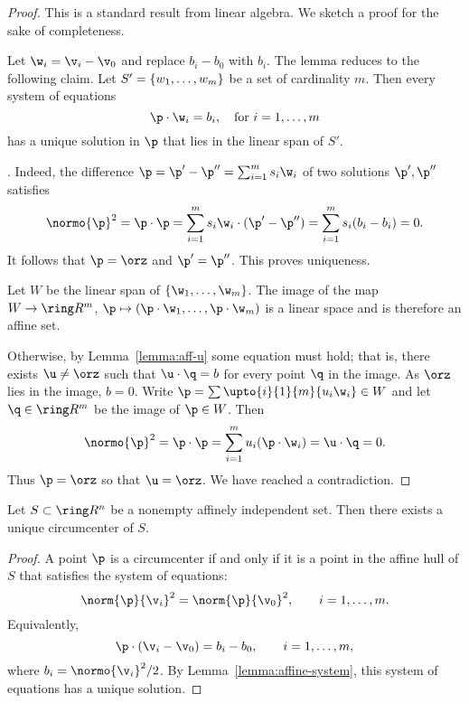 \begin{cnl}
\begin{proof} This is a standard result from linear algebra.
We sketch a proof for the sake of completeness.  

Let $\w_i = \v_i-\v_0$ and replace $b_i-b_0$ with $b_i$.  
The lemma reduces to the following claim.
Let $S' = \{{w}_{1},\ldots,{w}_{m}\}$ be a  set
of cardinality $m$.  Then every system of equations
\[  
\p \cdot \w_i = b_i,\quad \text{for } \fordots{i}{1}{m}
\] 
has a unique solution in $\p$ that lies in the linear span of $S'$.

. Indeed, the difference 
$\p = \p'-\p'' = \sumupto{i}{1}{m}{ s_i \w_i}$ of two solutions
$\p',\p''$ satisfies
\[  
\normo{\p}^2=\p\cdot\p = \sumupto{i}{1}{m}{ s_i \w_i} \cdot (\p' - \p'') =
\sumupto{i}{1}{m}{ s_i (b_i-b_i)}= 0.
\] 
It follows that $\p=\orz$ and $\p'=\p''$.  This proves uniqueness.

Let $W$ be the linear span of $\setenumdots{\w}{1}{m}$.  The image of the
map $W\to\vecR{m}$, $\p\mapsto (\p\cdot\w_1,\ldots,\p\cdot\w_m)$ is
a linear space and is therefore an affine set.

Otherwise, by Lemma~\ref{lemma:aff-u} some equation must hold; that
is, there exists $\u\ne \orz$ such that $\u\cdot \q =b$ for every
point $\q$ in the image.  As $\orz$ lies in the image, $b=0$.  Write
$\p = \sum\upto{i}{1}{m}{ u_i \w_i}\in W$ and let $\q\in\vecR{m}$ be the image of
$\p\in W$.  Then
\[  
\normo{\p}^2 = \p\cdot\p = \sumupto{i}{1}{m}{ u_i (\p \cdot \w_i)} = \u\cdot \q = 0.
\]  
Thus $\p=\orz$ so that $\u=\orz$.  We have reached a contradiction.
\end{proof}

\begin{lemma}
\label{lemma:circumcenter exists}
%
Let $S\subset \vecR{n}$ be a nonempty affinely independent set.  Then
there exists a unique circumcenter of $S$.
\end{lemma}

\begin{proof} 
  A point $\p$ is a circumcenter if and only if it is a point in the
  affine hull of $S$ that satisfies the system of equations:
\[  
\norm{\p}{\v_i}^2 = \norm{\p}{\v_0}^2,\qquad \fordots{i}{1}{m}.
\] 
Equivalently,
\[  
\p\cdot (\v_i-\v_0) = b_i-b_0,\qquad \fordots{i}{1}{m},
\] 
where $b_i = \normo{\v_i}^2/2$.  By
Lemma~\ref{lemma:affine-system}, this system of equations has a unique
solution.
\end{proof}


\end{cnl}
